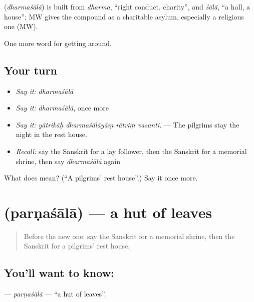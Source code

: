 \begin{cousinweb}
\textbf{} (\emph{dharmaśālā}) is built from \emph{dharma}, \textquotedblleft{}right conduct, charity\textquotedblright{}, and \emph{śālā}, \textquotedblleft{}a hall, a house\textquotedblright{}; MW gives the compound as a charitable asylum, especially a religious one (MW).
\end{cousinweb}

\begin{grammarlens}[title={What you've built}]
One more word for getting around.
\end{grammarlens}

\subsection*{Your turn}
\begin{itemize}
\raggedright
  \item \emph{Say it:} \emph{dharmaśālā}
  \item \emph{Say it:} \emph{dharmaśālā}, once more
  \item \emph{Say it:} \emph{yātrikāḥ dharmaśālāyāṃ rātriṃ vasanti.} — The pilgrims stay the night in the rest house.
  \item \emph{Recall:} say the Sanskrit for a lay follower, then the Sanskrit for a memorial shrine, then say \emph{dharmaśālā} again
\end{itemize}

\begin{tcolorbox}[breakable,colback=teal!4,colframe=teal!35!black,title={Before you move on}]
What does  mean? (\textquotedblleft{}A pilgrims' rest house\textquotedblright{}.) Say it once more.
\end{tcolorbox}
\section[\texorpdfstring{\sk{पर्णशाला} (parṇaśālā)}{पर्णशाला (parṇaśālā)}]{ (parṇaśālā) — a hut of leaves}

\label{lesson:SA-C402-parnasala}



\begin{quote}
Before the new one: say the Sanskrit for a memorial shrine, then the Sanskrit for a pilgrims' rest house.
\end{quote}

\subsection*{You'll want to know: }
\textbf{} — \emph{parṇaśālā} — \textquotedblleft{}a hut of leaves\textquotedblright{}.

